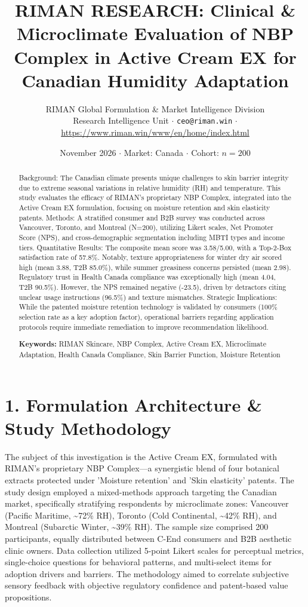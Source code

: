 \documentclass[10pt,twocolumn,a4paper]{article}
\title{\textbf{RIMAN RESEARCH: Clinical \& Microclimate Evaluation of NBP Complex in Active Cream EX for Canadian Humidity Adaptation}}
\author{RIMAN Global Formulation \& Market Intelligence Division\\
\small Research Intelligence Unit $\cdot$ \texttt{ceo@riman.win} $\cdot$ \url{https://www.riman.win/www/en/home/index.html}}
\date{November 2026 \quad $\cdot$ \quad Market: Canada \quad $\cdot$ \quad Cohort: $n = 200$}
\begin{document}
\maketitle

\begin{abstract}
Background: The Canadian climate presents unique challenges to skin barrier integrity due to extreme seasonal variations in relative humidity (RH) and temperature. This study evaluates the efficacy of RIMAN's proprietary NBP Complex, integrated into the Active Cream EX formulation, focusing on moisture retention and skin elasticity patents. Methods: A stratified consumer and B2B survey was conducted across Vancouver, Toronto, and Montreal (N=200), utilizing Likert scales, Net Promoter Score (NPS), and cross-demographic segmentation including MBTI types and income tiers. Quantitative Results: The composite mean score was 3.58/5.00, with a Top-2-Box satisfaction rate of 57.8\%. Notably, texture appropriateness for winter dry air scored high (mean 3.88, T2B 85.0\%), while summer greasiness concerns persisted (mean 2.98). Regulatory trust in Health Canada compliance was exceptionally high (mean 4.04, T2B 90.5\%). However, the NPS remained negative (-23.5), driven by detractors citing unclear usage instructions (96.5\%) and texture mismatches. Strategic Implications: While the patented moisture retention technology is validated by consumers (100\% selection rate as a key adoption factor), operational barriers regarding application protocols require immediate remediation to improve recommendation likelihood.

\vspace{0.4em}
\noindent\textbf{Keywords:} RIMAN Skincare, NBP Complex, Active Cream EX, Microclimate Adaptation, Health Canada Compliance, Skin Barrier Function, Moisture Retention
\end{abstract}

\section{1. Formulation Architecture \& Study Methodology}
The subject of this investigation is the Active Cream EX, formulated with RIMAN's proprietary NBP Complex—a synergistic blend of four botanical extracts protected under 'Moisture retention' and 'Skin elasticity' patents. The study design employed a mixed-methods approach targeting the Canadian market, specifically stratifying respondents by microclimate zones: Vancouver (Pacific Maritime, \textasciitilde{}72\% RH), Toronto (Cold Continental, \textasciitilde{}42\% RH), and Montreal (Subarctic Winter, \textasciitilde{}39\% RH). The sample size comprised 200 participants, equally distributed between C-End consumers and B2B aesthetic clinic owners. Data collection utilized 5-point Likert scales for perceptual metrics, single-choice questions for behavioral patterns, and multi-select items for adoption drivers and barriers. The methodology aimed to correlate subjective sensory feedback with objective regulatory confidence and patent-based value propositions.
\end{document}
